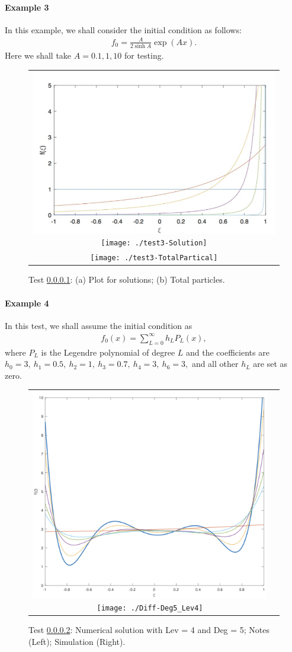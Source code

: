 \documentclass[final,leqno]{siamltex704}
\begin{document}
\paragraph{Example 3}\label{Sect2-Ex3}
In this example, we shall consider the initial condition as follows:
\begin{eqnarray*}
f_0=\frac{A}{2\sinh A}\exp(Ax).
\end{eqnarray*}
Here we shall take $A=0.1,1,10$ for testing.
\begin{figure}[h!]
\centering
\begin{tabular}{c}
\includegraphics[width=.45\textwidth]{./Fig_notes/Fig1_note}
  \texttt{[image: ./test3-Solution]}\\
   \texttt{[image: ./test3-TotalPartical]} 
\end{tabular}
\caption{Test \ref{Sect2-Ex3}: (a) Plot for solutions; (b) Total particles.}
\end{figure}

\paragraph{Example 4}\label{Test:Diffusion-Test4}
In this test, we shall assume the initial condition as
\begin{eqnarray*}
f_0(x)=\sum_{L=0}^\infty h_LP_L(x),
\end{eqnarray*}
where $P_L$ is the Legendre polynomial of degree $L$ and the coefficients are $h_0=3,\ h_1=0.5,\ h_2=1,\ h_3=0.7,\ h_4=3,\ h_6=3,$ and all other $h_L$ are set as zero.
\begin{figure}[H]
\centering
\begin{tabular}{cc}
 \includegraphics[width=.45\textwidth]{./Fig_notes/Fig3_note}
  \texttt{[image: ./Diff-Deg5\_Lev4]}
\end{tabular}
\caption{Test \ref{Test:Diffusion-Test4}: Numerical solution with Lev = 4 and Deg = 5; Notes (Left); Simulation (Right).}
\end{figure}
\end{document}
